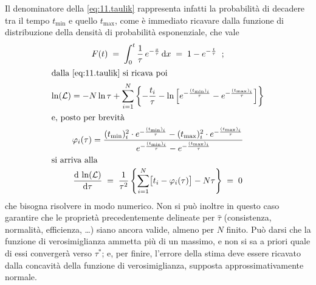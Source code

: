 Il denominatore della \eqref{eq:11.taulik} rappresenta
infatti la probabilit\`a di decadere tra il tempo $t_{\min}$
e quello $t_{\max}$, come \`e immediato ricavare dalla
funzione di distribuzione della densit\`a di probabilit\`a
esponenziale, che vale
\begin{gather*}
  F(t) \; = \; \int_0^t \frac{1}{\tau} \, e^{-
    \frac{x}{\tau} } \, \mathrm{d} x \; = \; 1 - e^{-
    \frac{t}{\tau} } \;\; ; \\
  \intertext{dalla \eqref{eq:11.taulik} si ricava poi}
  \ln( \mathcal{L} ) = -N \ln \tau + \sum_{i=1}^N \left\{
    - \frac{t_i}{\tau} - \ln \left[ e^{-
        \frac{(t_{\min})_i}{\tau}} -  e^{-
        \frac{(t_{\max})_i}{\tau}} \right] \right\} \\
  \intertext{e, posto per brevit\`a}
  \varphi_i(\tau) = \frac{ (t_{\min})_i^2 \cdot e^{-
      \frac{(t_{\min})_i}{\tau}} - (t_{\max})_i^2 \cdot
    e^{- \frac{(t_{\max})_i}{\tau}}}{e^{-
      \frac{(t_{\min})_i}{\tau}} - e^{-
      \frac{(t_{\max})_i}{\tau}}} \\
  \intertext{si arriva alla}
  \frac{\mathrm{d} \, \ln( \mathcal{L} ) }{\mathrm{d} \tau} \; = \;
  \frac{1}{\tau^2} \left\{ \sum_{i=1}^N \bigl[ t_i -
    \varphi_i(\tau) \bigr] - N \tau \right\} \; = \; 0
\end{gather*}
che bisogna risolvere in modo numerico.  Non si pu\`o
inoltre in questo caso garantire che le propriet\`a
precedentemente delineate per $\hat \tau$ (consistenza,
normalit\`a, efficienza, \ldots) siano ancora valide, almeno
per $N$ finito.  Pu\`o darsi che la funzione di
verosimiglianza ammetta pi\`u di un massimo, e non si sa a
priori quale di essi converger\`a verso $\tau^*$; e, per
finire, l'errore della stima deve essere ricavato dalla
concavit\`a della funzione di verosimiglianza, supposta
approssimativamente normale.%

\endinput
